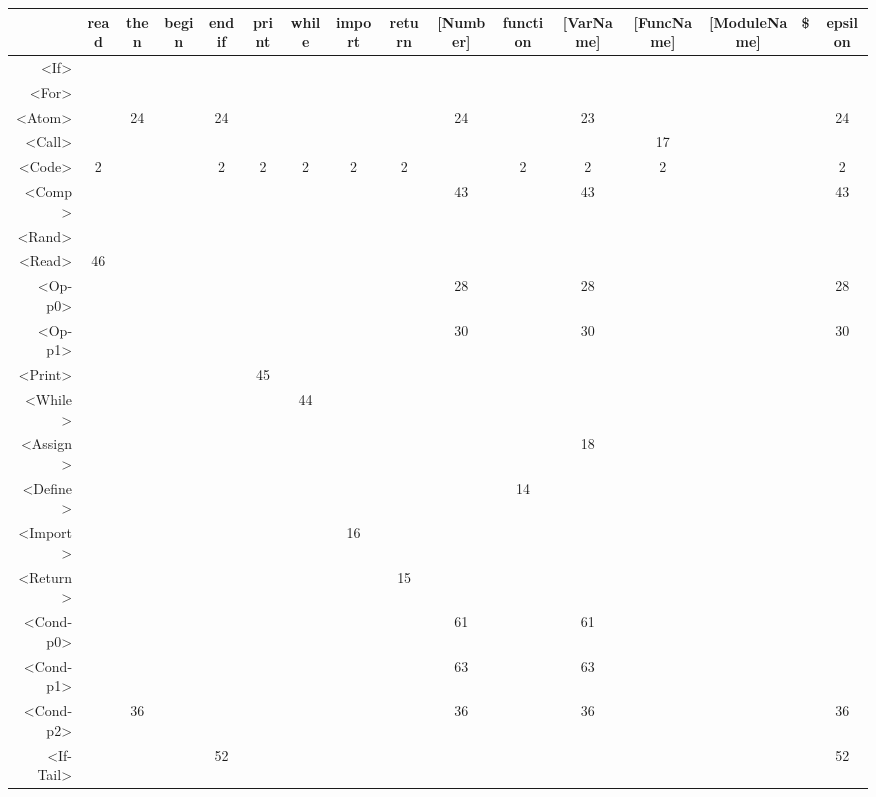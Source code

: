 \begin{tabular}{r|c@{ }c@{ }c@{ }c@{ }c@{ }c@{ }c@{ }c@{ }c@{ }c@{ }c@{ }c@{ }c@{ }c@{ }c@{ }}
 & read & then & begin & endif & print & while & import & return & [Number] & function & [VarName] & [FuncName] & [ModuleName] & \$ & epsilon \\\hline
<If> &   &   &   &   &   &   &   &   &   &   &   &   &   &   &   \\\hline
<For> &   &   &   &   &   &   &   &   &   &   &   &   &   &   &   \\\hline
<Atom> &   & 24 &   & 24 &   &   &   &   & 24 &   & 23 &   &   &   & 24 \\\hline
<Call> &   &   &   &   &   &   &   &   &   &   &   & 17 &   &   &   \\\hline
<Code> & 2 &   &   & 2 & 2 & 2 & 2 & 2 &   & 2 & 2 & 2 &   &   & 2 \\\hline
<Comp> &   &   &   &   &   &   &   &   & 43 &   & 43 &   &   &   & 43 \\\hline
<Rand> &   &   &   &   &   &   &   &   &   &   &   &   &   &   &   \\\hline
<Read> & 46 &   &   &   &   &   &   &   &   &   &   &   &   &   &   \\\hline
<Op-p0> &   &   &   &   &   &   &   &   & 28 &   & 28 &   &   &   & 28 \\\hline
<Op-p1> &   &   &   &   &   &   &   &   & 30 &   & 30 &   &   &   & 30 \\\hline
<Print> &   &   &   &   & 45 &   &   &   &   &   &   &   &   &   &   \\\hline
<While> &   &   &   &   &   & 44 &   &   &   &   &   &   &   &   &   \\\hline
<Assign> &   &   &   &   &   &   &   &   &   &   & 18 &   &   &   &   \\\hline
<Define> &   &   &   &   &   &   &   &   &   & 14 &   &   &   &   &   \\\hline
<Import> &   &   &   &   &   &   & 16 &   &   &   &   &   &   &   &   \\\hline
<Return> &   &   &   &   &   &   &   & 15 &   &   &   &   &   &   &   \\\hline
<Cond-p0> &   &   &   &   &   &   &   &   & 61 &   & 61 &   &   &   &   \\\hline
<Cond-p1> &   &   &   &   &   &   &   &   & 63 &   & 63 &   &   &   &   \\\hline
<Cond-p2> &   & 36 &   &   &   &   &   &   & 36 &   & 36 &   &   &   & 36 \\\hline
<If-Tail> &   &   &   & 52 &   &   &   &   &   &   &   &   &   &   & 52 \\\hline

\end{tabular}
